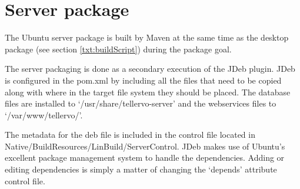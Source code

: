 



\section{Server package}
\label{txt:serverPackage}
The Ubuntu server package is built by Maven at the same time as the desktop package (see section \ref{txt:buildScript}) during the package goal.  

The server packaging is done as a secondary execution of the JDeb plugin.  JDeb is configured in the pom.xml by including all the files that need to be copied along with where in the target file system they should be placed. The database files are installed to `/usr/share/tellervo-server' and the webservices files to `/var/www/tellervo/'. 

The metadata for the deb file is included in the control file located in Native/BuildResources/LinBuild/ServerControl.  JDeb makes use of Ubuntu's excellent package management system to handle the dependencies.  Adding or editing dependencies is simply a matter of changing the `depends' attribute control file.  

